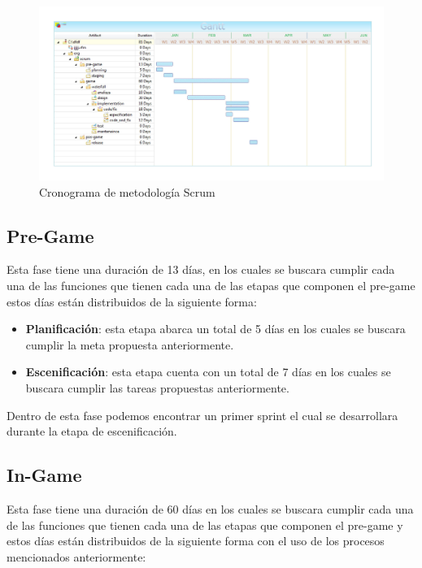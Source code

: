\begin{figure}[H]
	\centering
	\includegraphics[scale=0.10,]{imagenes/Metodologia/cronograma.pdf}
	\caption{Cronograma de metodología Scrum }
	\label{fig:cronograma}
\end{figure}

\subsection{Pre-Game}
Esta fase tiene una duración de 13 días, en los cuales se buscara cumplir cada una de las funciones que tienen cada una de las etapas que componen el pre-game estos días están distribuidos de la siguiente forma:
\begin{itemize}
	\item \textbf{Planificación}: esta etapa abarca un total de 5 días en los cuales se buscara cumplir la meta propuesta anteriormente.
	\item \textbf{Escenificación}: esta etapa cuenta con  un total de 7 días en los cuales se buscara cumplir las tareas propuestas anteriormente.
	
\end{itemize}

Dentro de esta fase podemos encontrar un primer sprint el cual se desarrollara durante la etapa de escenificación.

\subsection{In-Game}
Esta fase tiene una duración de 60 días en los cuales se buscara cumplir cada una de las funciones que tienen cada una de las etapas que componen el pre-game y estos días están distribuidos de la siguiente forma con el uso de los procesos mencionados anteriormente:

